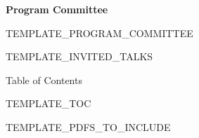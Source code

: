 \documentclass[10pt]{article}
\begin{document}
\begin{center}
\textbf{Program Committee}
\end{center}
TEMPLATE_PROGRAM_COMMITTEE
\newpage

TEMPLATE_INVITED_TALKS

\pagestyle{plain}
\begin{center}
Table of Contents
\end{center}
\newcommand\page[1]{\rightskip=25pt \dotfill\rlap{\hbox to 25pt{\hfill#1}}\par}
\begin{itemize}[leftmargin=*,label={}]
TEMPLATE_TOC
\end{itemize}
\newpage


\setcounter{page}{1}

TEMPLATE_PDFS_TO_INCLUDE
\end{document}
